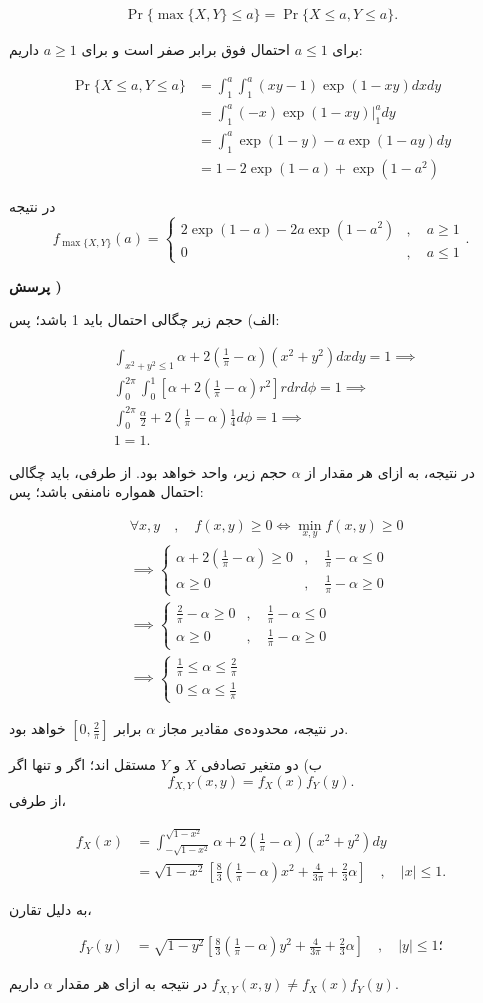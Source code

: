 \documentclass{article}
\newcounter{questionnumber}
\newcommand{\Q}{
\textbf{پرسش \thequestionnumber)}
\stepcounter{questionnumber}
}
\newcommand{\eqn}[1]{
\begin{equation}\begin{split}
#1
\end{split}\end{equation}
}
\begin{document}
\eqn{
\Pr\{\max\{X,Y\}\le a\}=\Pr\{X\le a,Y\le a\}.
}

برای $a\le 1$ احتمال فوق برابر صفر است و برای $a\ge 1$ داریم:
\eqn{
\Pr\{X\le a,Y\le a\}&=\int_1^a\int_1^a (xy-1)\exp(1-xy)dxdy
\\&=\int_1^a(-x)\exp(1-xy)\Big|_1^ady
\\&=\int_1^a\exp(1-y)-a\exp(1-ay)dy
\\&=1-2\exp(1-a)+\exp(1-a^2)
}
در نتیجه
$$
f_{\max\{X,Y\}}(a)=\begin{cases}
2\exp(1-a)-2a\exp(1-a^2)&,\quad a\ge 1\\
0&,\quad a\le 1
\end{cases}
.
$$

\Q

الف) حجم زیر چگالی احتمال باید 1 باشد؛ پس:
\eqn{
&\int_{x^2+y^2\le 1}\alpha+2(\frac{1}{\pi}-\alpha)(x^2+y^2)dxdy=1
\implies
\\&
\int_0^{2\pi}\int_0^1\left[\alpha+2(\frac{1}{\pi}-\alpha)r^2\right]rdrd\phi=1
\implies
\\&
\int_0^{2\pi}\frac{\alpha}{2}+2(\frac{1}{\pi}-\alpha)\frac{1}{4}d\phi=1
\implies
\\&
1=1.
}
در نتیجه، به ازای هر مقدار از $\alpha$ حجم زیر، واحد خواهد بود. از طرفی، باید چگالی احتمال همواره نامنفی باشد؛ پس:
\eqn{
&
\forall x,y\quad,\quad f(x,y)\ge 0\iff \min_{x,y}f(x,y)\ge 0
\\&\implies 
\begin{cases}
\alpha+2(\frac{1}{\pi}-\alpha)\ge 0&,\quad \frac{1}{\pi}-\alpha\le 0\\
\alpha\ge 0&,\quad \frac{1}{\pi}-\alpha\ge 0
\end{cases}
\\&\implies 
\begin{cases}
\frac{2}{\pi}-\alpha\ge 0&,\quad \frac{1}{\pi}-\alpha\le 0\\
\alpha\ge 0&,\quad \frac{1}{\pi}-\alpha\ge 0
\end{cases}
\\&\implies 
\begin{cases}
\frac{1}{\pi}\le \alpha\le \frac{2}{\pi}\\
0\le \alpha\le \frac{1}{\pi}
\end{cases}
}

در نتیجه، محدوده‌ی مقادیر مجاز 
$
\alpha
$
برابر
$
[0,\frac{2}{\pi}]
$
خواهد بود.

ب) دو متغیر تصادفی 
$
X
$
و
$
Y
$
مستقل اند؛ اگر و تنها اگر
$$
f_{X,Y}(x,y)=f_{X}(x)f_{Y}(y).
$$
از طرفی،
\eqn{
f_X(x)&=\int_{-\sqrt{1-x^2}}^{\sqrt{1-x^2}} \alpha+2(\frac{1}{\pi}-\alpha)(x^2+y^2)dy
\\&=
\sqrt{1-x^2}\left[
\frac{8}{3}\left(\frac{1}{\pi}-\alpha\right)x^2+\frac{4}{3\pi}+\frac{2}{3}\alpha
\right]
\quad,\quad |x|\le 1.
}
به دلیل تقارن،
\eqn{
f_Y(y)&=
\sqrt{1-y^2}\left[
\frac{8}{3}\left(\frac{1}{\pi}-\alpha\right)y^2+\frac{4}{3\pi}+\frac{2}{3}\alpha
\right]
\quad,\quad |y|\le 1؛
}
در نتیجه به ازای هر مقدار $\alpha$ داریم
$
f_{X,Y}(x,y)\ne f_X(x)f_Y(y)
$.
\end{document}
